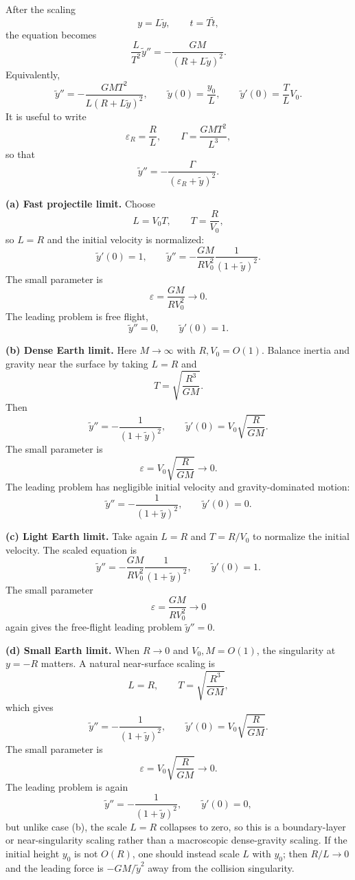 \begin{solution}
After the scaling
\[
y=L\tilde y,\qquad t=T\tilde t,
\]
the equation becomes
\[
\frac{L}{T^2}\tilde y''=-\frac{GM}{(R+L\tilde y)^2}.
\]
Equivalently,
\[
\tilde y''=-\frac{GMT^2}{L(R+L\tilde y)^2},
\qquad
\tilde y(0)=\frac{y_0}{L},\qquad
\tilde y'(0)=\frac{T}{L}V_0.
\]
It is useful to write
\[
\varepsilon_R=\frac{R}{L},\qquad
\Gamma=\frac{GMT^2}{L^3},
\]
so that
\[
\tilde y''=-\frac{\Gamma}{(\varepsilon_R+\tilde y)^2}.
\]

\textbf{(a) Fast projectile limit.}
Choose
\[
L=V_0T,\qquad T=\frac{R}{V_0},
\]
so $L=R$ and the initial velocity is normalized:
\[
\tilde y'(0)=1,\qquad
\tilde y''=-\frac{GM}{RV_0^2}\frac{1}{(1+\tilde y)^2}.
\]
The small parameter is
\[
\varepsilon=\frac{GM}{RV_0^2}\to 0.
\]
The leading problem is free flight,
\[
\tilde y''=0,\qquad \tilde y'(0)=1.
\]

\textbf{(b) Dense Earth limit.}
Here $M\to\infty$ with $R,V_0=O(1)$.  Balance inertia and gravity near the surface by taking $L=R$ and
\[
T=\sqrt{\frac{R^3}{GM}}.
\]
Then
\[
\tilde y''=-\frac{1}{(1+\tilde y)^2},\qquad
\tilde y'(0)=V_0\sqrt{\frac{R}{GM}}.
\]
The small parameter is
\[
\varepsilon=V_0\sqrt{\frac{R}{GM}}\to 0.
\]
The leading problem has negligible initial velocity and gravity-dominated motion:
\[
\tilde y''=-\frac{1}{(1+\tilde y)^2},\qquad \tilde y'(0)=0.
\]

\textbf{(c) Light Earth limit.}
Take again $L=R$ and $T=R/V_0$ to normalize the initial velocity.  The scaled equation is
\[
\tilde y''=-\frac{GM}{RV_0^2}\frac{1}{(1+\tilde y)^2},\qquad \tilde y'(0)=1.
\]
The small parameter
\[
\varepsilon=\frac{GM}{RV_0^2}\to 0
\]
again gives the free-flight leading problem $\tilde y''=0$.

\textbf{(d) Small Earth limit.}
When $R\to0$ and $V_0,M=O(1)$, the singularity at $y=-R$ matters.  A natural near-surface scaling is
\[
L=R,\qquad T=\sqrt{\frac{R^3}{GM}},
\]
which gives
\[
\tilde y''=-\frac{1}{(1+\tilde y)^2},\qquad
\tilde y'(0)=V_0\sqrt{\frac{R}{GM}}.
\]
The small parameter is
\[
\varepsilon=V_0\sqrt{\frac{R}{GM}}\to0.
\]
The leading problem is again
\[
\tilde y''=-\frac{1}{(1+\tilde y)^2},\qquad \tilde y'(0)=0,
\]
but unlike case (b), the scale $L=R$ collapses to zero, so this is a boundary-layer or near-singularity scaling rather than a macroscopic dense-gravity scaling.  If the initial height $y_0$ is not $O(R)$, one should instead scale $L$ with $y_0$; then $R/L\to0$ and the leading force is $-GM/\tilde y^2$ away from the collision singularity.
\end{solution}

